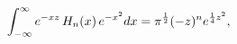 \[\int_{-\infty}^{\infty}e^{-xz}\mathop{H_{n}\/}\nolimits\!\left(x\right)e^{-x^{%
2}}dx=\pi^{\frac{1}{2}}(-z)^{n}e^{\frac{1}{4}z^{2}},\]